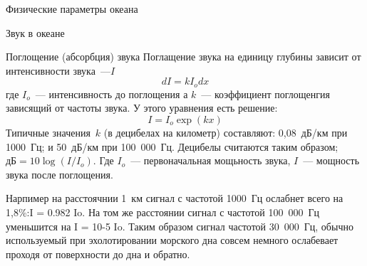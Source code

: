 \begin{chapter}{Физические параметры океана}
\begin{section}{Звук в океане}
\begin{paragraph}{Поглощение (абсорбция) звука}
Поглащение звука на единицу глубины зависит от интенсивности звука~---$I$
\begin{equation}
dI = k I_o dx
\end{equation}
где $I_o$~--- интенсивность до поглощения а $k$~--- коэффициент
поглощенгия зависящий от частоты звука. У этого уравнения есть
решение:
\begin{equation}
I = I_o \exp(k x)
\end{equation}
Типичные значения~$k$ (в децибелах на километр) составляют: 0,08~дБ/км
при 1000~Гц; и 50~дБ/км при 100~000~Гц. Децибелы считаются таким
образом; $\mbox{дБ} = 10 \log(I / I_o)$. Где $I_o$~--- первоначальная мощьность
звука, $I$~--- мощность звука после поглощения.
%

Нарпимер на расстоячнии 1~км сигнал с частотой 1000~Гц ослабнет всего
на 1,8\%:I = 0.982 Io. На том же расстоянии сигнал с частотой
100~000~Гц уменьшится на I = 10-5 Io. Таким образом сигнал частотой
30~000~Гц, обычно используемый при эхолотировании морского дна совсем
немного ослабевает проходя от поверхности до дна и обратно.
%


\end{paragraph}
\end{section}
\end{chapter}
